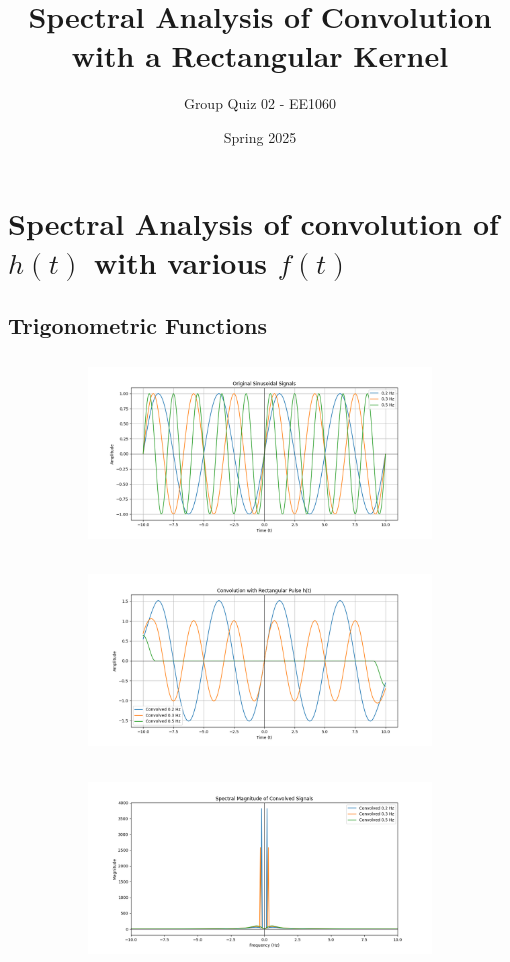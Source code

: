 \documentclass[a4paper,12pt]{article}
\begin{document}
\title{Spectral Analysis of Convolution with a Rectangular Kernel}
\author{Group Quiz 02 - EE1060}
\date{Spring 2025}
\maketitle

\section*{Spectral Analysis of convolution of $h(t)$ with various $f(t)$}
\subsection*{Trigonometric Functions}
\begin{figure}[H]
    \centering
    \begin{subfigure}{0.5\textwidth}
        \centering
        \includegraphics[height=5cm]{figs/sin1.png}
    \end{subfigure}%
    \begin{subfigure}{0.5\textwidth}
        \centering
        \includegraphics[height=5cm]{figs/sin2.png}
    \end{subfigure}
    \begin{subfigure}{0.5\textwidth}
        \centering
        \includegraphics[height=5cm]{figs/sin3.png}
    \end{subfigure}%
\end{figure}
\end{document}

